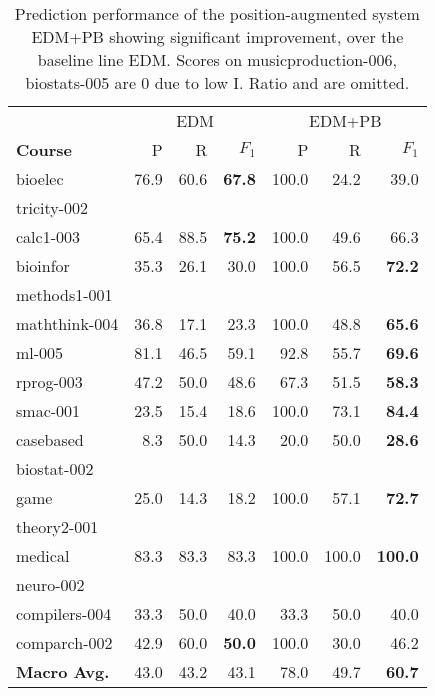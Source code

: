 \documentclass[11pt,a4paper]{article}
\begin{document}
\begin{table}
\centering
\def\arraystretch{1.15}%
\scriptsize
\begin{tabular}{|l|r|r|r||r|r|r|}
\hline
 &
 \multicolumn{3}{c||}{EDM} &
 \multicolumn{3}{c|}{EDM+PB} \\
 \cline{2-7}
 \bf Course&  P&  R& $F_1$&  P&  R& $F_1$\\
\hline
\hline
{\sc bioelec} & 76.9& 60.6& \textbf{67.8}& 100.0& 24.2& 39.0\\
{\sc tricity-002} & & & & & & \\
\hline
{\sc calc1-003} & 65.4& 88.5& \textbf{75.2}& 100.0& 49.6& 66.3\\
\hline
{\sc bioinfor} & 35.3& 26.1& 30.0& 100.0& 56.5& \textbf{72.2}\\
{\sc methods1-001} & & & & & & \\
\hline
{\sc maththink-004} & 36.8& 17.1& 23.3& 100.0& 48.8& \textbf{65.6}\\
\hline
{\sc ml-005} & 81.1& 46.5& 59.1 & 92.8& 55.7& \textbf{69.6}\\
\hline
{\sc rprog-003} & 47.2& 50.0& 48.6& 67.3& 51.5& \textbf{58.3}\\
\hline
{\sc smac-001} & 23.5& 15.4& 18.6& 100.0& 73.1& \textbf{84.4}\\
\hline
{\sc casebased} & 8.3& 50.0& 14.3& 20.0& 50.0& \textbf{28.6}\\
{\sc biostat-002} & & & & & & \\
\hline
{\sc game} & 25.0& 14.3& 18.2& 100.0& 57.1& \textbf{72.7}\\
{\sc theory2-001} & & & & & & \\
\hline
{\sc medical} & 83.3& 83.3& 83.3& 100.0& 100.0& \textbf{100.0}\\
{\sc neuro-002} & & & & & & \\
\hline
{\sc compilers-004} & 33.3& 50.0& 40.0& 33.3& 50.0& 40.0\\
\hline
{\sc comparch-002} & 42.9& 60.0& \textbf{50.0}& 100.0& 30.0& 46.2\\
\hline
\hline
\textbf{Macro Avg.}& 43.0& 43.2& 43.1& 78.0& 49.7& \textbf{60.7}\\
\hline
\end{tabular}
\caption{Prediction performance of the position-augmented system
  EDM+PB showing significant improvement, over the baseline line
  EDM. Scores on musicproduction-006, biostats-005 are 0 due 
  to low I. Ratio and are omitted.
}
\label{tab:resbasevspbias}
\end{table}
\end{document}
